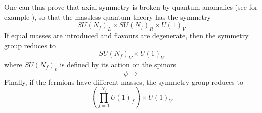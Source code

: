 One can thus prove that axial symmetry is broken by quantum anomalies (see for example \cite{schwartz}), so that the massless quantum theory has the symmetry 
\begin{equation*}
    SU(N_f)_L \times SU(N_f)_R \times U(1)_V
\end{equation*}
If equal masses are introduced and flavours are degenerate, then the symmetry group reduces to 
\begin{equation*}
    SU(N_f)_V \times U(1)_V
\end{equation*} 
where $SU(N_f)_v$ is defined by its action on the spinors 
\begin{equation*}
    \psi \to 
\end{equation*}
Finally, if the fermions have different masses, the symmetry group reduces to 
\begin{equation*}
    \left(\prod_{f=1}^{N_f} U(1)_f \right) \times U(1)_V
\end{equation*}

